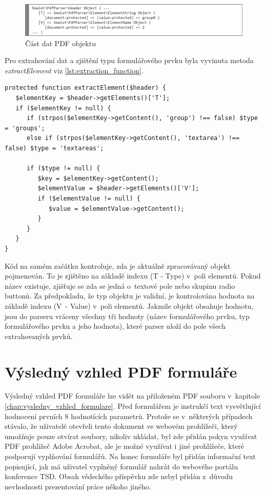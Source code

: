 \begin{figure}[h!]
\centering
\includegraphics[width=15cm]{img/parsing_object}
\caption{Část dat PDF objektu}
\label{fig:parsing_object}
\end{figure}
\par
Pro extrahování dat a zjištění typu formulářového prvku byla vyvinuta metoda \textit{extractElement} viz \ref{lst:extraction_function}.
\begin{lstlisting}[caption = {Funkční kód pro uložení formulářových prvků z~PDF objektů}, label = {lst:extraction_function}, captionpos=b]
protected function extractElement($header) {
   $elementKey = $header->getElements()['T'];                                                      
   if ($elementKey != null) {
      if (strpos($elementKey->getContent(), 'group') !== false) $type = 'groups';
      else if (strpos($elementKey->getContent(), 'textarea') !== false) $type = 'textareas';
                       
      if ($type != null) {
         $key = $elementKey->getContent();
         $elementValue = $header->getElements()['V'];
         if ($elementValue != null) {
            $value = $elementValue->getContent();
         }    
      }
   }
}
\end{lstlisting}
Kód na samém začátku kontroluje, zda je aktuálně zpracovávaný objekt pojmenován. To je zjištěno na základě indexu  (T - Type) v~poli elementů. Pokud název existuje, zjišťuje se zda se jedná o~textové pole nebo skupinu radio buttonů. Za předpokladu, že typ objektu je validní, je kontrolována hodnota na základě indexu  (V~- Value) v~poli elementů. Jakmile objekt obsahuje hodnotu, jsou do parseru vráceny všechny tři hodnoty (název formulářového prvku, typ formulářového prvku a jeho hodnota), které parser uloží do pole všech extrahovaných prvků.

\section{Výsledný vzhled PDF formuláře}
Výsledný vzhled PDF formuláře lze vidět na přiloženém PDF souboru v~kapitole \ref{chap:vysledny_vzhled_formulare}. Před formulářem je instrukčí text vysvětlující hodnocení prvních 8 hodnotících parametrů. Protože se v~některých případech stávalo, že uživatelé otevřeli tento dokument ve webovém prohlížeči, který umožňuje pouze otvírat soubory, nikoliv ukládat, byl zde přidán pokyn využívat PDF prohlížeč Adobe Acrobat, ale je možné využívat i jiné prohlížeče, které podporují vyplňování formulářů. Na konec formuláře byl přidán informační text popisující, jak má uživatel vyplněný formulář nahrát do webového portálu konference TSD. Obsah vědeckého příspěvku zde nebyl přidán z~důvodu nevhodnosti prezentování práce někoho jiného.

